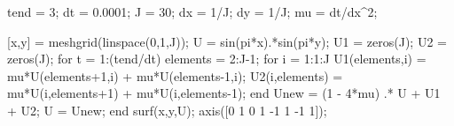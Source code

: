tend = 3;
dt = 0.0001;
J = 30;
dx = 1/J;
dy = 1/J;
mu = dt/dx^2;

[x,y] = meshgrid(linspace(0,1,J));
U = sin(pi*x).*sin(pi*y); 
U1 = zeros(J);
U2 = zeros(J);
for t = 1:(tend/dt)
    elements = 2:J-1;  
    for i = 1:1:J
        U1(elements,i) = mu*U(elements+1,i) + mu*U(elements-1,i); 
        U2(i,elements) = mu*U(i,elements+1) + mu*U(i,elements-1);
    end
    Unew = (1 - 4*mu) .* U + U1 + U2;
    U = Unew;  
end
surf(x,y,U); axis([0 1 0 1 -1 1 -1 1]);


